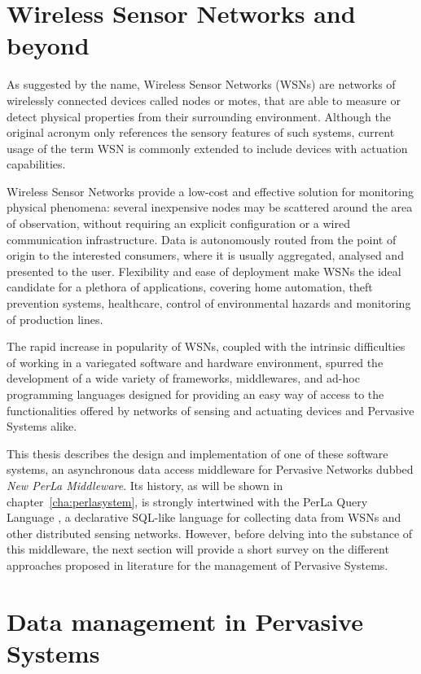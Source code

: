 \section{Wireless Sensor Networks and beyond}

As suggested by the name, Wireless Sensor Networks (WSNs) are networks of
wirelessly connected devices called nodes or motes, that are able to measure or
detect physical properties from their surrounding environment. Although the
original acronym only references the sensory features of such systems, current
usage of the term WSN is commonly extended to include devices with actuation
capabilities.

Wireless Sensor Networks provide a low-cost and effective solution for
monitoring physical phenomena: several inexpensive nodes may be scattered
around the area of observation, without requiring an explicit configuration or
a wired communication infrastructure. Data is autonomously routed from the
point of origin to the interested consumers, where it is usually aggregated,
analysed and presented to the user. Flexibility and ease of deployment make
WSNs the ideal candidate for a plethora of applications, covering home
automation, theft prevention systems, healthcare, control of environmental
hazards and monitoring of production lines.

The rapid increase in popularity of WSNs, coupled with the intrinsic
difficulties of working in a variegated software and hardware environment,
spurred the development of a wide variety of frameworks, middlewares, and
ad-hoc programming languages designed for providing an easy way of access to
the functionalities offered by networks of sensing and actuating devices and
Pervasive Systems alike.

This thesis describes the design and implementation of one of these software
systems, an asynchronous data access middleware for Pervasive Networks dubbed
\textit{New PerLa Middleware}. Its history, as will be shown in
chapter~\ref{cha:perlasystem}, is strongly intertwined with the PerLa Query
Language \cite{tse_perla}, a declarative SQL-like language for collecting data
from WSNs and other distributed sensing networks. However, before delving into
the substance of this middleware, the next section will provide a short survey
on the different approaches proposed in literature for the management of
Pervasive Systems.


\section{Data management in Pervasive Systems}

